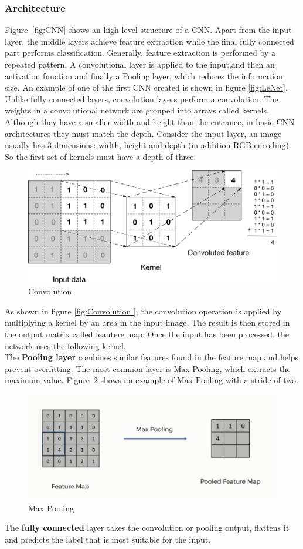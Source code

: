 \subsubsection{Architecture}
Figure~\ref{fig:CNN} shows an high-level structure of a CNN. Apart from the input layer, the middle layers achieve feature extraction while the final fully connected part performs classification.
Generally, feature extraction is performed by a repeated pattern. A convolutional layer is applied to the input,and then an activation function
and finally a Pooling layer, which reduces the information size.
An example of one of the first CNN created is shown in figure \ref{fig:LeNet}.
Unlike fully connected layers, convolution layers perform a convolution. The weights in a convolutional network are grouped into arrays called kernels.
Although they have a smaller width and height than the entrance, in basic CNN architectures they must match the depth.
Consider the input layer, an image usually has 3 dimensions: width, height and depth (in addition RGB encoding). So the first set of kernels must have a depth of three.\\
\begin{figure}[]
    \centering
        \includegraphics[width=0.7\linewidth]{images/deepLearning/conv.png}
    \caption{Convolution \cite{DeepLearningApproach} }
    \label{fig:Convolution }
\end{figure}
As shown in figure \ref{fig:Convolution  }, the convolution operation is applied by multiplying a kernel by an area in the input image. The result is then stored in the output matrix called feautere map. Once the input has been processed, the network uses the following kernel.\\
The \textbf{Pooling layer} combines similar features found in the feature map and helps prevent overfitting. The most common layer is Max Pooling, which extracts the maximum value.
Figure~\ref{fig:MaxPool } shows an example of Max Pooling with a stride of two.\\
\begin{figure}[]
    \centering
        \includegraphics[width=0.7\linewidth]{images/deepLearning/maxpool.png}

    \caption{Max Pooling \cite{MaxPoolImage} }
    \label{fig:MaxPool }
\end{figure}
The \textbf{fully connected} layer takes the convolution or pooling output, flattens it and predicts the label that is most suitable for the input.
